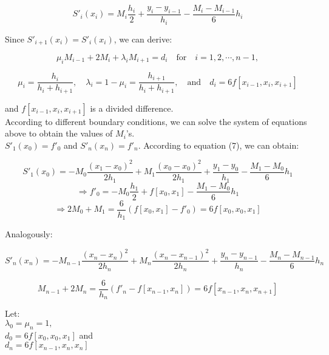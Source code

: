 \documentclass{article}
\begin{document}
 
$$ S'_{i}(x_{i})=M_{i}{\frac {h_{i}}{2}}+{\frac {y_{i}-y_{i-1}}{h_{i}}}-{\frac {M_{i}-M_{i-1}}{6}}h_{i}$$

Since $ S'_{i+1}(x_{i})=S'_{i}(x_{i})$, we can derive:

$$\mu _{i}M_{i-1}+2M_{i}+\lambda _{i}M_{i+1}=d_{i}\quad {\text{for}}\quad i=1,2,\cdots ,n-1,$$
 
$$\mu _{i}={\frac {h_{i}}{h_{i}+h_{i+1}}},\quad \lambda _{i}=1-\mu _{i}={\frac {h_{i+1}}{h_{i}+h_{i+1}}},\quad {\text{and}}\quad d_{i}=6f[x_{i-1},x_{i},x_{i+1}]$$

and $f[x_{i-1},x_{i},x_{i+1}]$ is a divided difference.\\

According to different boundary conditions, we can solve the system of equations above to obtain the values of $M_{i}$'s.\\

$S'_{1}(x_{0})=f'_{0}$ and $S'_{n}(x_{n})=f'_{n}$. According to equation (7), we can obtain:

$$S'_{1}(x_{0})=-M_{0}{\frac {(x_{1}-x_{0})^{2}}{2h_{1}}}+M_{1}{\frac {(x_{0}-x_{0})^{2}}{2h_{1}}}+{\frac {y_{1}-y_{0}}{h_{1}}}-{\frac {M_{1}-M_{0}}{6}}h_{1}$$
$$\Rightarrow f'_{0}=-M_{0}{\frac {h_{1}}{2}}+f[x_{0},x_{1}]-{\frac {M_{1}-M_{0}}{6}}h_{1}$$
$$\Rightarrow 2M_{0}+M_{1}={\frac {6}{h_{1}}}(f[x_{0},x_{1}]-f'_{0})=6f[x_{0},x_{0},x_{1}]$$

Analogously:

$$ S'_{n}(x_{n})=-M_{n-1}{\frac {(x_{n}-x_{n})^{2}}{2h_{n}}}+M_{n}{\frac {(x_{n}-x_{n-1})^{2}}{2h_{n}}}+{\frac {y_{n}-y_{n-1}}{h_{n}}}-{\frac {M_{n}-M_{n-1}}{6}}h_{n}$$

$$M_{n-1}+2M_{n}={\frac {6}{h_{n}}}(f'_{n}-f[x_{n-1},x_{n}])=6f[x_{n-1},x_{n},x_{n+1}]$$

Let:\\
$\lambda _{0}=\mu _{n}=1,$\\
$d_{0}=6f[x_{0},x_{0},x_{1}]$ and\\ 
$d_{n}=6f[x_{n-1},x_{n},x_{n}]$
\end{document}
